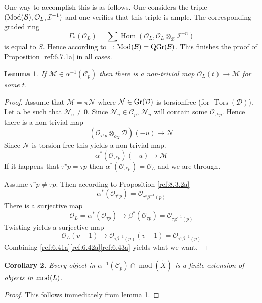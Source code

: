 \documentclass{amsproc}
\def\Bscr{{\mathcal B}}
\def\Cscr{{\mathcal C}}
\def\Dscr{{\mathcal D}}
\def\Iscr{{\mathcal I}}
\def\Mscr{{\mathcal M}}
\def\Nscr{{\mathcal N}}
\def\Oscr{{\mathcal O}}
\def\Mod{\mathop{\text{Mod}}}
\def\mod{\mathop{\text{mod}}}
\def\Gr{\mathop{\text{Gr}}}
\def\Tors{\operatorname{Tors}}
\def\Hom{\operatorname {Hom}}
\def\coh{\operatorname {mod}}
\def\Tors{\operatorname {Tors}}
\def\r{\rightarrow}
\let\oldtext\text
\def\text#1{\oldtext{\upshape #1}}
\DeclareMathOperator{\QGr}{QGr}
\newtheorem{lemmas}{Lemma}[subsection]
\newtheorem{corollarys}[lemmas]{Corollary}
\theoremstyle{definition}
\theoremstyle{remark}
\numberwithin{equation}{section}
\numberwithin{table}{section}
\numberwithin{figure}{section}
\def\Gr{\mathop{\text{Gr}}}
\begin{document}
One way to accomplish this is as follows. One considers the triple \cite{AZ}
$(\Mod(\Bscr),\Oscr_L,\Iscr^{-1})$ and one verifies that this triple is
ample. The corresponding graded ring 
\[
\Gamma_\ast(\Oscr_L)=\sum \Hom(\Oscr_L,\Oscr_L\otimes_{\Bscr}
\Iscr^{-n})
\]
 is equal to $S$. Hence according to \cite{AZ}~:
$\Mod(\Bscr)=\QGr(\Bscr)$. This finishes the proof of Proposition
\ref{ref:6.7.1a} in all cases.

\begin{lemmas}
\label{ref:6.7.3a}
If $\Mscr \in\alpha^{-1}(\Cscr_p)$ then there is a non-trivial map 
$\Oscr_L(t)\r \Mscr$ for some $t$.
\end{lemmas}
\begin{proof}
Assume that $\Mscr=\pi\Nscr$ where $\Nscr\in\Gr(\Dscr)$  is
torsionfree (for $\Tors(\Dscr)$). Let $u$ be such that $\Nscr_u\neq
0$. Since $\Nscr_u\in\Cscr_p$, $\Nscr_u$ will contain some
$\Oscr_{\tau^v p}$. Hence there is a non-trivial map
\[
(\Oscr_{\tau^v p}\otimes_{o_X} \Dscr)(-u)\r \Nscr
\]
Since $\Nscr$ is torsion free this yields a non-trivial map.
\begin{equation}
\label{ref:6.41a}
\alpha^\ast(\Oscr_{\tau^v p})(-u)\r \Mscr
\end{equation}
If it happens that $\tau^v p=\tau p$ then $\alpha^\ast(\Oscr_{\tau ^v
  p})=\Oscr_L$ and we are through.

Assume $\tau^v p\neq \tau p$. Then according to Proposition \ref{ref:8.3.2a}
\begin{equation}
\label{ref:6.42a}
\alpha^\ast(\Oscr_{\tau^v p})
 =\Oscr_{\tau^v \beta^{-1}(p)}
\end{equation}
There is a surjective map
\[
\Oscr_L=\alpha^\ast(\Oscr_{\tau p})\r \beta^\ast(\Oscr_{\tau
  p})=\Oscr_{\tau \beta^{-1}(p)} 
\]
Twisting yields a surjective map
\begin{equation}
\label{ref:6.43a}
\Oscr_L(v-1)\r \Oscr_{\tau \beta^{-1}(p)}(v-1)
=
\Oscr_{\tau^v \beta^{-1}(p)}
\end{equation}
Combining \eqref{ref:6.41a}\eqref{ref:6.42a}\eqref{ref:6.43a} yields what we want.
\end{proof}




\begin{corollarys}
\label{ref:6.7.4a}
Every  object in $\alpha^{-1}(\Cscr_p)\cap \coh(\tilde{X})$
is a finite extension of objects  in $\mod(L)$.
\end{corollarys}
\begin{proof}
This follows immediately from  lemma \ref{ref:6.7.3a}.
\end{proof}
\end{document}
